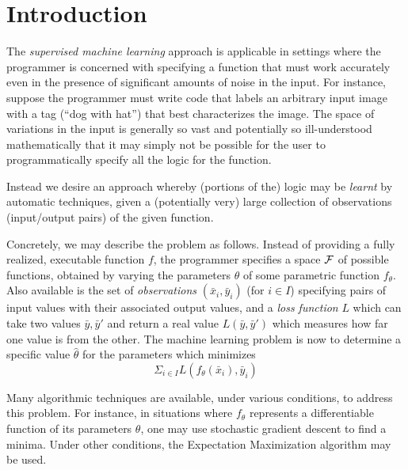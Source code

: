\documentclass{article} %
\begin{document}
\def\Or{\vee}
\def\And{\wedge}
\def\Arrow{\rightarrow}
\def\Xor{\;\mbox{xor}\;}
\def\Ind{\;\mbox{Ind}}

\section{Introduction}
The {\em supervised machine learning} approach is applicable in settings where the programmer is concerned with specifying a function that must work accurately even in the presence of significant amounts of noise in the input. For instance, suppose the programmer must write code that labels an arbitrary input image with a tag (``dog with hat'') that best characterizes the image. The space of variations in the input is generally so vast and potentially so ill-understood mathematically that it may simply not be possible for the user to programmatically specify all the logic for the function.

Instead we desire an approach whereby (portions of the) logic may be {\em learnt} by automatic techniques, given a (potentially very) large collection of observations (input/output pairs) of the given function. 

Concretely, we may describe the problem as follows. Instead of providing a fully realized, executable function $f$, the programmer specifies a space $\cal F$ of possible functions, obtained by varying the parameters $\theta$ of some parametric function $f_{\theta}$.  Also available is the set of {\em observations} $(\bar{x}_i, \bar{y}_i)$ (for $i\in I$) specifying pairs of input values with their associated output values, and a {\em loss function} $L$ which can take two values $\bar{y},\bar{y}'$ and return a real value  $L(\bar{y},\bar{y}')$ which measures how far one value is from the other. The machine learning problem is now to determine a specific value $\hat{\theta}$ for the parameters which minimizes $$\Sigma_{i \in I} L(f_\theta(\bar{x}_i), \bar{y}_i)$$

Many algorithmic techniques are available, under various conditions, to address this problem. For instance, in situations where $f_{\theta}$ represents a differentiable function of its parameters $\theta$, one may use stochastic gradient descent to find a minima. Under other conditions, the Expectation Maximization algorithm may be used.
\end{document}
